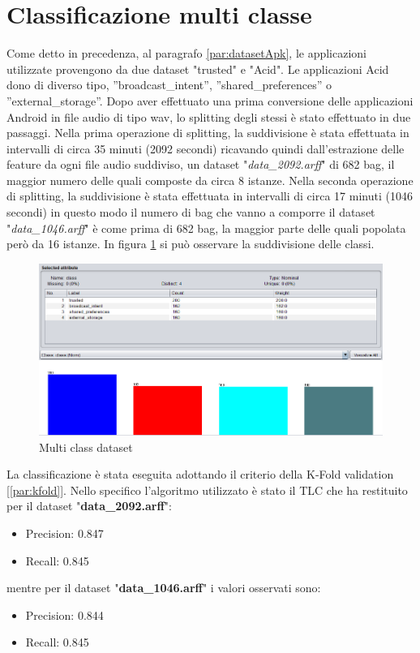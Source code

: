 \section{Classificazione multi classe}
Come detto in precedenza, al paragrafo \ref{par:datasetApk}, le applicazioni utilizzate provengono da due dataset "trusted" e "Acid". Le applicazioni Acid dono di diverso tipo, ”broadcast\_intent”, ”shared\_preferences” o ”external\_storage”. Dopo aver effettuato una prima conversione delle applicazioni Android in file audio di tipo wav, lo splitting degli stessi è stato effettuato in due passaggi. Nella prima operazione di splitting, la suddivisione è stata effettuata in intervalli di circa  35 minuti (2092 secondi) ricavando quindi dall'estrazione delle feature da ogni file audio suddiviso, un dataset "\textit{data\_2092.arff}" di 682 bag, il maggior numero delle quali composte da circa 8 istanze. Nella seconda operazione di splitting, la suddivisione è stata effettuata in intervalli di circa 17 minuti (1046 secondi) in questo modo il numero di bag che vanno a comporre il dataset "\textit{data\_1046.arff}" è come prima di 682 bag, la maggior parte delle quali popolata però da 16 istanze.
In figura \ref{fig:multiclassdataset} si può osservare la suddivisione delle classi. 
\begin{figure}[h]
\centering
    \includegraphics[width=0.9\linewidth]{imgs/capitolo5/multicalsse/682 bag 4 classi.png} 
    \caption{Multi class dataset}
    \label{fig:multiclassdataset}
\end{figure}
\FloatBarrier
La classificazione è stata eseguita adottando il criterio della K-Fold validation [\ref{par:kfold}].
Nello specifico l'algoritmo utilizzato è stato il TLC che ha restituito per il dataset "\textbf{data\_2092.arff}":
\begin{itemize}
    \item Precision: 0.847 
    \item Recall: 0.845
\end{itemize}
mentre per il dataset "\textbf{data\_1046.arff}" i valori osservati sono:
\begin{itemize}
    \item Precision: 0.844 
    \item Recall: 0.845
\end{itemize}

